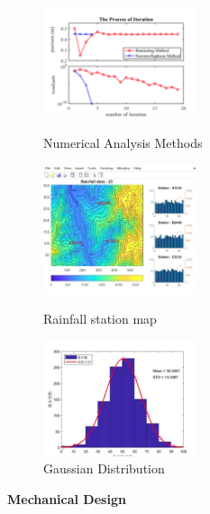 \documentclass[10pt, letterpaper]{article}
\begin{document}
\begin{figure}[htbp]
        \vspace{0.9cm}

        \begin{minipage}[c]{0.33\linewidth}
            \centering
            \includegraphics[width=4.5cm]{fig/Numerical Analysis/以不同數值分析方法求解.png} 
            \caption{Numerical Analysis Methods}
        \end{minipage}%
        \begin{minipage}[c]{0.33\linewidth}
            \centering
            \includegraphics[width=4.5cm]{fig/Numerical Analysis/Rainfall station maps, Real-time Rainfall and Cumulative Rainfall.jpg} 
            \caption{Rainfall station map}
        \end{minipage}%
        \begin{minipage}[c]{0.33\linewidth}
            \centering
            \includegraphics[width=4.5cm]{fig/Numerical Analysis/隨機數製作高斯分布理論值.png} 
            \caption{Gaussian Distribution}
        \end{minipage} 
    \end{figure}



    \newpage
    {\fontsize{30pt}{30pt} \textbf{Mechanical Design}} %
    
    \vspace{0.3cm}
    
\end{document}
